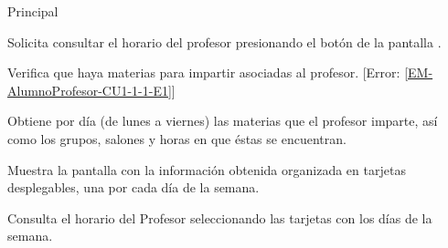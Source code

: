\begin{UCtrayectoria}{Principal}

	\UCpaso [\UCactor] Solicita consultar el horario del profesor presionando el botón  de la pantalla .

	\UCpaso Verifica que haya materias para impartir asociadas al profesor. [Error: \ref{EM-AlumnoProfesor-CU1-1-1-E1}]

	\UCpaso Obtiene por día (de lunes a viernes) las materias que el profesor imparte, así como los grupos, salones y horas en que éstas se encuentran. 

	\UCpaso Muestra la pantalla  con la información obtenida organizada en tarjetas desplegables, una por cada día de la semana. 

	\UCpaso[\UCactor] Consulta el horario del Profesor seleccionando las tarjetas con los días de la semana.

\end{UCtrayectoria}




